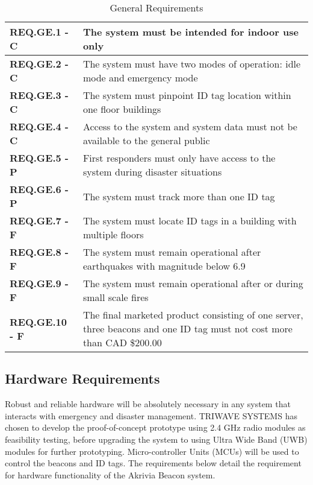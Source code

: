 \bgroup
\def\arraystretch{1.5}
\begin{table}[H]
\centering
\begin{tabular}{ | m{3.25cm} | m{12.5cm} |}
 \hline
 \textbf{REQ.GE.1 - C} & The system must be intended for indoor use only \\
\hline
 \textbf{REQ.GE.2 - C} & The system must have two modes of operation: idle mode and emergency mode \\
\hline
 \textbf{REQ.GE.3 - C} & The system must pinpoint ID tag location within one floor buildings \\
\hline
 \textbf{REQ.GE.4 - C} & Access to the system and system data must not be available to the general public \\
\hline
 \textbf{REQ.GE.5 - P} & First responders must only have access to the system during disaster situations \\
\hline
 \textbf{REQ.GE.6 - P} & The system must track more than one ID tag \\
\hline
 \textbf{REQ.GE.7 - F} & The system must locate ID tags in a building with multiple floors \\
\hline
 \textbf{REQ.GE.8 - F} & The system must remain operational after earthquakes with magnitude below 6.9 \\
\hline
 \textbf{REQ.GE.9 - F} & The system must remain operational after or during small scale fires \\
\hline
 \textbf{REQ.GE.10 - F} & The final marketed product consisting of one server, three beacons and one ID tag must not cost more than CAD \$200.00 \\
\hline
\end{tabular}
\caption{General Requirements}
\end{table}

\break
\subsection{Hardware Requirements}
Robust and reliable hardware will be absolutely necessary in any system that interacts with emergency and disaster management. TRIWAVE SYSTEMS has chosen to develop the proof-of-concept prototype using 2.4 GHz radio modules as feasibility testing, before upgrading the system to using Ultra Wide Band (UWB) modules for further prototyping. Micro-controller Units (MCUs) will be used to control the beacons and ID tags. The requirements below detail the requirement for hardware functionality of the Akrivia Beacon system.

